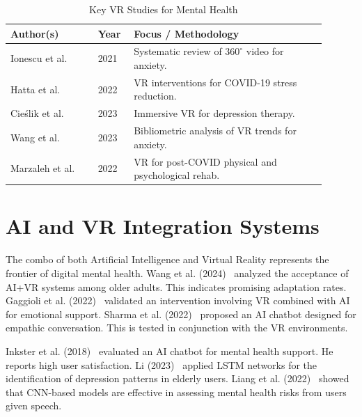 \begin{table}[H]
\centering
\small
\renewcommand{\arraystretch}{1.3}
\caption{Key VR Studies for Mental Health}
\label{tab:vr}
\begin{tabular}{|p{0.25\linewidth}|p{0.1\linewidth}|p{0.55\linewidth}|}
\hline
\rowcolor{gray!15} \textbf{Author(s)} & \textbf{Year} & \textbf{Focus / Methodology} \\ \hline
Ionescu et al. & 2021 & Systematic review of $360^{\circ}$ video for anxiety. \\ \hline
Hatta et al. & 2022 & VR interventions for COVID-19 stress reduction. \\ \hline
Cieślik et al. & 2023 & Immersive VR for depression therapy. \\ \hline
Wang et al. & 2023 & Bibliometric analysis of VR trends for anxiety. \\ \hline
Marzaleh et al. & 2022 & VR for post-COVID physical and psychological rehab. \\ \hline
\end{tabular}
\end{table}
\newpage
\section{AI and VR Integration Systems}
The combo of both Artificial Intelligence and Virtual Reality represents the frontier of digital mental health. Wang et al. (2024)~\cite{wang2024aging} analyzed the acceptance of AI+VR systems among older adults. This indicates promising adaptation rates. Gaggioli et al. (2022)~\cite{gaggioli2022emotional} validated an intervention involving VR combined with AI for emotional support. Sharma et al. (2022)~\cite{sharma2022empathetic} proposed an AI chatbot designed for empathic conversation. This is tested in conjunction with the VR environments.

Inkster et al. (2018)~\cite{inkster2018ai} evaluated an AI chatbot for mental health support. He reports high user satisfaction. Li (2023)~\cite{li2023lstm} applied LSTM networks for the identification of depression patterns in elderly users. Liang et al. (2022)~\cite{liang2022cnn} showed that CNN-based models are effective in assessing mental health risks from users given speech.

